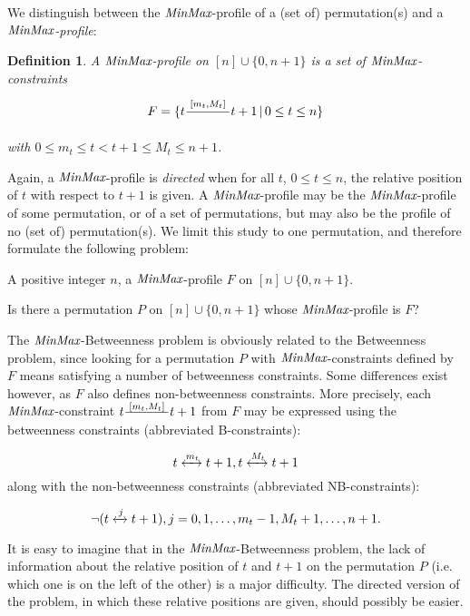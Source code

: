 \documentclass{article}
\newcommand{\M}{\mbox{\it MinMax}}
\newcommand{\n}{[n]}
\newcommand{\lrf}[1]{\xleftrightarrow{#1}}
\newtheorem{defin}{Definition}
\newcommand{\bdefin}{\begin{defin}\rm}
\newcommand{\edefin}{\end{defin} }
\begin{document}
We distinguish between the $\M$-profile of a (set of) permutation(s) and a {\em $\M$-profile}:

\bdefin
A {\em $\M$-profile} on $\n\cup\{0, n+1\}$ is a set of {\em $\M$-constraints} 

$$F=\{t\frac{\hspace*{0.1cm}\scriptstyle{[m_t, M_t]}\hspace*{0.1cm}}{}t+1\, |\, 0\leq t\leq n\}$$

\noindent with $0\leq m_t\leq t< t+1\leq  M_t\leq n+1$. 
\edefin

Again, a $\M$-profile is {\em directed} when for all $t$, $0\leq t\leq n$, the relative position of $t$ with respect to 
$t+1$ is given.
A $\M$-profile may be the $\M$-profile of some permutation, or of a set of permutations, but may  also be the profile 
of no (set of) permutation(s). We limit this study to one permutation, and therefore formulate the following problem:
\newpage

\noindent {\sc $\M$-Betweenness}

 A positive integer $n$, a  $\M$-profile $F$ on $\n\cup \{0, n+1\}$. 

 Is there a permutation $P$ on $\n\cup\{0,n+1\}$ whose $\M$-profile is $F$? 
\bigskip



The $\M$-{\sc Betweenness} problem is obviously related to the {\sc Betweenness} problem, since looking for a permutation
$P$ with $\M$-constraints defined by $F$ means satisfying a number of betweenness constraints.  Some differences
exist however, as $F$ also defines non-betweenness constraints. More precisely, each $\M$-constraint
$t\frac{\hspace*{0.1cm}\scriptstyle{[m_t, M_t]}\hspace*{0.1cm}}{}t+1$ from $F$ may be expressed using the betweenness constraints 
(abbreviated B-constraints):

\begin{equation}
\label{eq:Bc}
t\lrf{m_t}t+1, t\lrf{M_t}t+1
\end{equation}
\noindent along with the non-betweenness constraints (abbreviated NB-constraints):

\begin{equation}
\label{eq:NBc1}
\neg (t\lrf{j}t+1), j=0, 1, \ldots, m_t-1,M_t+1, \ldots, n+1.
\end{equation}


It is easy to imagine that in the $\M$-{\sc Betweenness} problem, the lack of information about
the relative position of  $t$ and $t+1$ on the permutation $P$ (i.e. which one is on the left of the other)
is a major difficulty. The directed version of the problem, in which these relative positions are given, should
possibly be easier.
\bigskip
\end{document}
